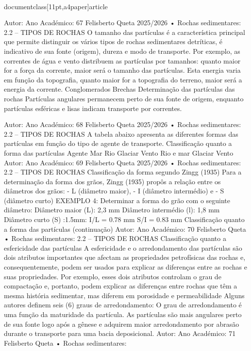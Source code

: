 \\documentclass[11pt,a4paper]{article}
\begin{document}
Autor:
Ano Académico:
67
Felisberto Queta
2025/2026
• Rochas sedimentares: 
2.2 – TIPOS DE ROCHAS
O tamanho das partículas é a característica principal que permite distinguir os vários tipos de rochas
sedimentares detríticas, é indicativo de sua fonte (origem), dureza e modo de transporte. Por
exemplo, as correntes de água e vento distribuem as partículas por tamanhos: quanto maior for a
força da corrente, maior será o tamanho das partículas. Esta energia varia em função da topografia,
quanto maior for a topografia do terreno, maior será a energia da corrente.
Conglomerados Brechas
Determinação das partículas das rochas  
Partículas angulares permanecem perto de sua fonte de origem, enquanto partículas esféricas e lisas 
indicam transporte por correntes.\

Autor:
Ano Académico:
68
Felisberto Queta
2025/2026
• Rochas sedimentares: 
2.2 – TIPOS DE ROCHAS
A tabela abaixo apresenta as diferentes formas das partículas em função do tipo de agente de
transporte.
Classificação quanto a forma das partículas   
Agente
Mar
Rio
Glaciar
Vento
Rio e mar
Glaciar
Vento
Autor:
Ano Académico:
69
Felisberto Queta
2025/2026
• Rochas sedimentares: 
2.2 – TIPOS DE ROCHAS
Classificação da forma segundo Zingg (1935)
Para a determinação da forma dos grãos, 
Zingg (1935) propôs a relação entre os 
diâmetros dos grãos: 
- L (diâmetro maior), 
- I (diâmetro intermédio) e 
- S (diâmetro curto)
EXEMPLO 4:
Determinar a forma do grão 
com o seguinte diâmetro:
Diâmetro maior (L): 2,3 mm
Diâmetro intermédio (l): 1,8 mm 
Diâmetro curto (S) :1.5mm:
I/L = 0.78 mm
S/I = 0.83 mm
Classificação quanto a forma das partículas (continuação)   
Autor:
Ano Académico:
70
Felisberto Queta
• Rochas sedimentares: 
2.2 – TIPOS DE ROCHAS
Classificação quanto a esfericidade das partículas 
A esfericidade e o arredondamento das partículas são dois atributos importantes que afectam as
propriedades petrofísicas das rochas e, consequentemente, podem ser usados ​​para explicar as
diferenças entre as rochas e suas propriedades. Por exemplo, esses dois atributos controlam o grau
de compactação e, portanto, podem explicar as diferenças entre rochas que têm a mesma história
sedimentar, mas diferem em porosidade e permeabilidade
Alguns autores definem seis (6) graus de arredondamento:
O grau de arredondamento é uma função da maturidade da partícula. As partículas são mais 
angulares perto de sua fonte logo após a gênese e adquirem maior arredondamento por abrasão 
durante o transporte para uma bacia deposicional.
Autor:
Ano Académico:
71
Felisberto Queta
• Rochas sedimentares: 
\end{document}
